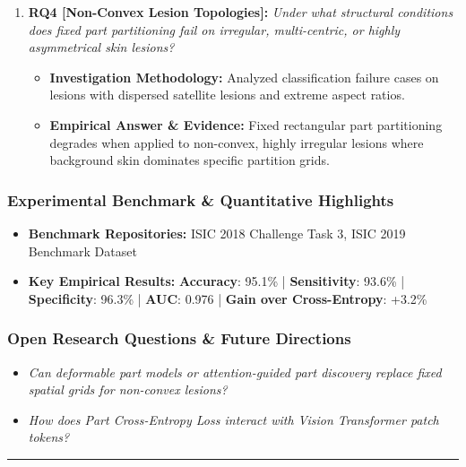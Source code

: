\begin{enumerate}[label=\textbf{\arabic*.}, leftmargin=*]
\begin{itemize}[leftmargin=1.5em]
  \end{itemize}
  \item \textbf{RQ4 [Non-Convex Lesion Topologies]:} \textit{Under what structural conditions does fixed part partitioning fail on irregular, multi-centric, or highly asymmetrical skin lesions?}
  \begin{itemize}[leftmargin=1.5em]
    \item \textbf{Investigation Methodology:} Analyzed classification failure cases on lesions with dispersed satellite lesions and extreme aspect ratios.
    \item \textbf{Empirical Answer \& Evidence:} Fixed rectangular part partitioning degrades when applied to non-convex, highly irregular lesions where background skin dominates specific partition grids.
  \end{itemize}
\end{enumerate}

\subsubsection*{Experimental Benchmark \& Quantitative Highlights}
\begin{itemize}[leftmargin=*]
  \item \textbf{Benchmark Repositories:} ISIC 2018 Challenge Task 3, ISIC 2019 Benchmark Dataset
  \item \textbf{Key Empirical Results:} \textbf{Accuracy}: 95.1\% \quad | \quad \textbf{Sensitivity}: 93.6\% \quad | \quad \textbf{Specificity}: 96.3\% \quad | \quad \textbf{AUC}: 0.976 \quad | \quad \textbf{Gain over Cross-Entropy}: +3.2\%
\end{itemize}

\subsubsection*{Open Research Questions \& Future Directions}
\begin{itemize}[leftmargin=*]
  \item \textit{Can deformable part models or attention-guided part discovery replace fixed spatial grids for non-convex lesions?}
  \item \textit{How does Part Cross-Entropy Loss interact with Vision Transformer patch tokens?}
\end{itemize}
\vspace{0.8em}\hrule\vspace{1.2em}
